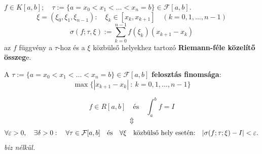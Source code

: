 \documentclass[a4paper,11.5pt]{article}
\begin{document}
	\begin{definition}
		$f\in K[a,b];\quad  \tau:=\{ a=x_0<x_1<\ldots<x_n=b \}\in \mathcal{F}[a,b]$.
		\[ \xi=(\xi_0,\xi_1,\xi_{n-1}):\quad \xi_k\in[x_k,x_{k+1}]\quad (k=0,1,\ldots,n-1) \]
		\[\sigma(f;\tau,\xi):= \sum_{k=0}^{n-1}f(\xi_k)(x_{k+1}-x_k) \]
		az $f$ függvény a $\tau$-hoz és a $\xi$ közbülső helyekhez tartozó \textbf{Riemann-féle közelítő összeg}e.
	\end{definition}
	\begin{definition}
		A $\tau:=\{ a=x_0<x_1<\ldots<x_n=b \}\in\mathcal{F}[a,b]$ \textbf{felosztás finomsága}:
		\[ \max\{ |x_{k+1}-x_k|\ :\ k=0,1,\ldots,n-1 \} \]
	\end{definition}
	\begin{theorem}
		\[ f\in R[a,b]\quad \text{és}\quad \int_a^bf=I\]
		\[\quad \Updownarrow\quad\]
		\[ \forall\varepsilon>0,\quad \exists\delta>0:\quad \forall\tau\in\mathcal{F}[a,b]\quad \text{és}\quad \forall\xi\text{\quad közbülső hely esetén:}\quad |\sigma(f;\tau;\xi)-I|<\varepsilon. \]
		\textit{biz nélkül.}
	\end{theorem}
\end{document}
